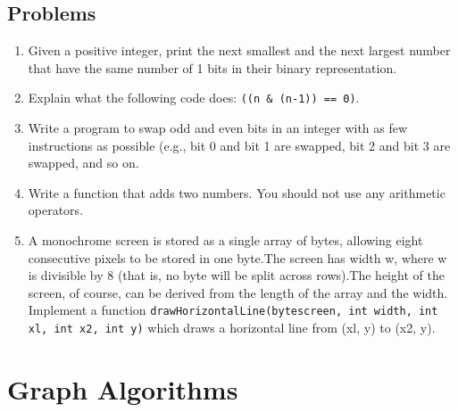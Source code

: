 \documentclass{article}
\begin{document}
	\subsection{Problems}
	\begin{enumerate}
		\item Given a positive integer, print the next smallest and the next largest number that have the same number of 1 bits in their binary representation.
		\item Explain what the following code does: \texttt{((n \& (n-1)) == 0)}.
		\item Write a program to swap odd and even bits in an integer with as few instructions as possible (e.g., bit 0 and bit 1 are swapped, bit 2 and bit 3 are swapped, and so on.
		\item Write a function that adds two numbers. You should not use any arithmetic operators.
		\item A monochrome screen is stored as a single array of bytes, allowing eight consecutive pixels to be stored in one byte.The screen has width w, where w is divisible by 8 (that is, no byte will be split across rows).The height of the screen, of course, can be derived from the length of the array and the width. Implement a function \texttt{drawHorizontalLine(byte\string[\string] screen, int width, int xl, int x2, int y)} which draws a horizontal line from (xl, y) to (x2, y).
	\end{enumerate}


\clearpage
\section{Graph Algorithms}
\end{document}
